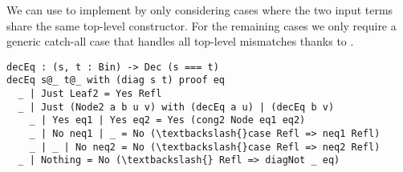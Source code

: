 \noindent
We can use  to implement 
by only considering cases where the two input terms share the same
top-level constructor.
For the remaining cases we only require a generic catch-all case that handles all top-level mismatches thanks to .

\begin{Verbatim}
decEq : (s, t : Bin) -> Dec (s === t)
decEq s@_ t@_ with (diag s t) proof eq
  _ | Just Leaf2 = Yes Refl
  _ | Just (Node2 a b u v) with (decEq a u) | (decEq b v)
    _ | Yes eq1 | Yes eq2 = Yes (cong2 Node eq1 eq2)
    _ | No neq1 | _ = No (\textbackslash{}case Refl => neq1 Refl)
    _ | _ | No neq2 = No (\textbackslash{}case Refl => neq2 Refl)
  _ | Nothing = No (\textbackslash{} Refl => diagNot _ eq)
\end{Verbatim}


